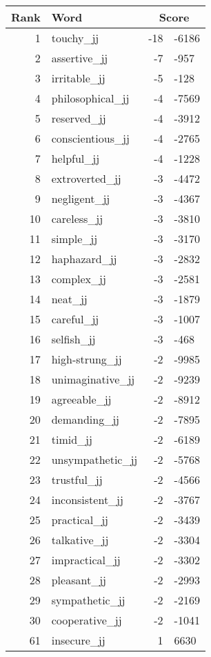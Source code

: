 \begin{longtable}[!htbp]{| rlr@{.}l |}
    \hline
    \textbf{Rank} & \textbf{Word} & \multicolumn{2}{c|}{\textbf{Score}} \\
    \hline
    \endhead
    1 & touchy\_jj & -18 & -6186 \\
    2 & assertive\_jj & -7 & -957 \\
    3 & irritable\_jj & -5 & -128 \\
    4 & philosophical\_jj & -4 & -7569 \\
    5 & reserved\_jj & -4 & -3912 \\
    6 & conscientious\_jj & -4 & -2765 \\
    7 & helpful\_jj & -4 & -1228 \\
    8 & extroverted\_jj & -3 & -4472 \\
    9 & negligent\_jj & -3 & -4367 \\
    10 & careless\_jj & -3 & -3810 \\
    11 & simple\_jj & -3 & -3170 \\
    12 & haphazard\_jj & -3 & -2832 \\
    13 & complex\_jj & -3 & -2581 \\
    14 & neat\_jj & -3 & -1879 \\
    15 & careful\_jj & -3 & -1007 \\
    16 & selfish\_jj & -3 & -468 \\
    17 & high-strung\_jj & -2 & -9985 \\
    18 & unimaginative\_jj & -2 & -9239 \\
    19 & agreeable\_jj & -2 & -8912 \\
    20 & demanding\_jj & -2 & -7895 \\
    21 & timid\_jj & -2 & -6189 \\
    22 & unsympathetic\_jj & -2 & -5768 \\
    23 & trustful\_jj & -2 & -4566 \\
    24 & inconsistent\_jj & -2 & -3767 \\
    25 & practical\_jj & -2 & -3439 \\
    26 & talkative\_jj & -2 & -3304 \\
    27 & impractical\_jj & -2 & -3302 \\
    28 & pleasant\_jj & -2 & -2993 \\
    29 & sympathetic\_jj & -2 & -2169 \\
    30 & cooperative\_jj & -2 & -1041 \\
    61 & insecure\_jj & 1 & 6630 \\

\end{longtable}
